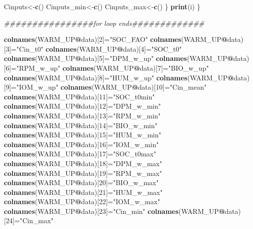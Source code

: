 \documentclass[
  10pt,
  b5paper,
]{book}
\newenvironment{Shaded}{\begin{snugshade}}{\end{snugshade}}
\newcommand{\CommentTok}[1]{\textcolor[rgb]{0.56,0.35,0.01}{\textit{#1}}}
\newcommand{\DecValTok}[1]{\textcolor[rgb]{0.00,0.00,0.81}{#1}}
\newcommand{\KeywordTok}[1]{\textcolor[rgb]{0.13,0.29,0.53}{\textbf{#1}}}
\newcommand{\NormalTok}[1]{#1}
\newcommand{\OperatorTok}[1]{\textcolor[rgb]{0.81,0.36,0.00}{\textbf{#1}}}
\newcommand{\StringTok}[1]{\textcolor[rgb]{0.31,0.60,0.02}{#1}}
\begin{document}
\begin{Shaded}
\begin{Highlighting}[]
{\NormalTok{Cinputs<-}\KeywordTok{c}\NormalTok{()}
\NormalTok{Cinputs_min<-}\KeywordTok{c}\NormalTok{()}
\NormalTok{Cinputs_max<-}\KeywordTok{c}\NormalTok{()}
\NormalTok{\}}
\KeywordTok{print}\NormalTok{(i)}
\NormalTok{\}}

\CommentTok{################for loop ends#############}

\KeywordTok{colnames}\NormalTok{(WARM_UP}\OperatorTok{@}\NormalTok{data)[}\DecValTok{2}\NormalTok{]=}\StringTok{"SOC_FAO"}
\KeywordTok{colnames}\NormalTok{(WARM_UP}\OperatorTok{@}\NormalTok{data)[}\DecValTok{3}\NormalTok{]=}\StringTok{"Cin_t0"}
\KeywordTok{colnames}\NormalTok{(WARM_UP}\OperatorTok{@}\NormalTok{data)[}\DecValTok{4}\NormalTok{]=}\StringTok{"SOC_t0"}
\KeywordTok{colnames}\NormalTok{(WARM_UP}\OperatorTok{@}\NormalTok{data)[}\DecValTok{5}\NormalTok{]=}\StringTok{"DPM_w_up"}
\KeywordTok{colnames}\NormalTok{(WARM_UP}\OperatorTok{@}\NormalTok{data)[}\DecValTok{6}\NormalTok{]=}\StringTok{"RPM_w_up"}
\KeywordTok{colnames}\NormalTok{(WARM_UP}\OperatorTok{@}\NormalTok{data)[}\DecValTok{7}\NormalTok{]=}\StringTok{"BIO_w_up"}
\KeywordTok{colnames}\NormalTok{(WARM_UP}\OperatorTok{@}\NormalTok{data)[}\DecValTok{8}\NormalTok{]=}\StringTok{"HUM_w_up"}
\KeywordTok{colnames}\NormalTok{(WARM_UP}\OperatorTok{@}\NormalTok{data)[}\DecValTok{9}\NormalTok{]=}\StringTok{"IOM_w_up"}
\KeywordTok{colnames}\NormalTok{(WARM_UP}\OperatorTok{@}\NormalTok{data)[}\DecValTok{10}\NormalTok{]=}\StringTok{"Cin_mean"}
\KeywordTok{colnames}\NormalTok{(WARM_UP}\OperatorTok{@}\NormalTok{data)[}\DecValTok{11}\NormalTok{]=}\StringTok{"SOC_t0min"}
\KeywordTok{colnames}\NormalTok{(WARM_UP}\OperatorTok{@}\NormalTok{data)[}\DecValTok{12}\NormalTok{]=}\StringTok{"DPM_w_min"}
\KeywordTok{colnames}\NormalTok{(WARM_UP}\OperatorTok{@}\NormalTok{data)[}\DecValTok{13}\NormalTok{]=}\StringTok{"RPM_w_min"}
\KeywordTok{colnames}\NormalTok{(WARM_UP}\OperatorTok{@}\NormalTok{data)[}\DecValTok{14}\NormalTok{]=}\StringTok{"BIO_w_min"}
\KeywordTok{colnames}\NormalTok{(WARM_UP}\OperatorTok{@}\NormalTok{data)[}\DecValTok{15}\NormalTok{]=}\StringTok{"HUM_w_min"}
\KeywordTok{colnames}\NormalTok{(WARM_UP}\OperatorTok{@}\NormalTok{data)[}\DecValTok{16}\NormalTok{]=}\StringTok{"IOM_w_min"}
\KeywordTok{colnames}\NormalTok{(WARM_UP}\OperatorTok{@}\NormalTok{data)[}\DecValTok{17}\NormalTok{]=}\StringTok{"SOC_t0max"}
\KeywordTok{colnames}\NormalTok{(WARM_UP}\OperatorTok{@}\NormalTok{data)[}\DecValTok{18}\NormalTok{]=}\StringTok{"DPM_w_max"}
\KeywordTok{colnames}\NormalTok{(WARM_UP}\OperatorTok{@}\NormalTok{data)[}\DecValTok{19}\NormalTok{]=}\StringTok{"RPM_w_max"}
\KeywordTok{colnames}\NormalTok{(WARM_UP}\OperatorTok{@}\NormalTok{data)[}\DecValTok{20}\NormalTok{]=}\StringTok{"BIO_w_max"}
\KeywordTok{colnames}\NormalTok{(WARM_UP}\OperatorTok{@}\NormalTok{data)[}\DecValTok{21}\NormalTok{]=}\StringTok{"HUM_w_max"}
\KeywordTok{colnames}\NormalTok{(WARM_UP}\OperatorTok{@}\NormalTok{data)[}\DecValTok{22}\NormalTok{]=}\StringTok{"IOM_w_max"}
\KeywordTok{colnames}\NormalTok{(WARM_UP}\OperatorTok{@}\NormalTok{data)[}\DecValTok{23}\NormalTok{]=}\StringTok{"Cin_min"}
\KeywordTok{colnames}\NormalTok{(WARM_UP}\OperatorTok{@}\NormalTok{data)[}\DecValTok{24}\NormalTok{]=}\StringTok{"Cin_max"}


}
\end{Highlighting}
\end{Shaded}
\end{document}
